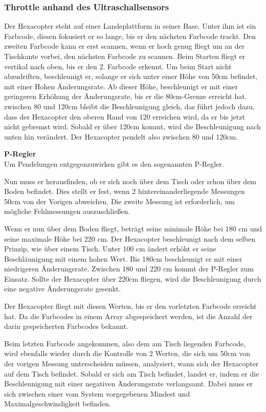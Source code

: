     \subsubsection{Throttle anhand des Ultraschallsensors}
    Der Hexacopter steht auf einer Landeplattform in seiner Base. Unter ihm ist ein Farbcode, diesen fokusiert er so lange, bis er den nächsten Farbcode trackt. Den zweiten Farbcode kann er erst scannen, wenn er hoch genug fliegt um an der Tischkante vorbei, den nächsten Farbcode zu scannen.
    Beim Starten fliegt er vertikal nach oben, bis er den 2. Farbcode erkennt. Um beim Start nicht abzudriften, beschleunigt er, solange er sich unter einer Höhe von 50cm befindet, mit einer Hohen Änderungsrate. Ab dieser Höhe, beschleunigt er mit einer geringeren Erhöhung der Änderungsrate, bis er die 80cm-Grenze erreicht hat.
    zwischen 80 und 120cm bleibt die Beschleunigung gleich, das führt jedoch dazu, dass der Hexacopter den oberen Rand von 120 erreichen wird, da er bis jetzt nicht gebremst wird. Sobald er über 120cm kommt, wird die Beschleunigung nach unten hin verändert. Der Hexacopter pendelt also zwischen 80 und 120cm.

    \textbf{P-Regler}\\
    Um Pendelungen entgegenzuwirken gibt es den sogenannten P-Regler.

    Nun muss er herausfinden, ob er sich noch über dem Tisch oder schon über dem Boden befindet. Dies stellt er fest, wenn 2 hintereinanderliegende Messungen 50cm von der Vorigen abweichen. Die zweite Messung ist erforderlich, um mögliche Fehlmessungen auszuschließen.

    Wenn er nun über dem Boden fliegt, beträgt seine minimale Höhe bei 180 cm und seine maximale Höhe bei 220 cm.
    Der Hexacopter beschleunigt nach dem selben Prinzip, wie über einem Tisch. Unter 100 cm ändert erhöht er seine Beschläunigung mit einem hohen Wert. Bis 180cm beschleunigt er mit einer niedrigeren Änderungsrate. Zwischen 180 und 220 cm kommt der P-Regler zum Einsatz. Sollte der Hexacopter über 220cm fliegen, wird die Beschleunigung durch eine negative Änderungsrate gesenkt.

    Der Hexacopter fliegt mit diesen Werten, bis er den vorletzten Farbcode erreicht hat. Da die Farbcodes in einem Array abgespeichert werden, ist die Anzahl der darin gespeicherten Farbcodes bekannt.

    Beim letzten Farbcode angekommen, also dem am Tisch liegenden Farbcode, wird ebenfalls wieder durch die Kontrolle von 2 Werten, die sich um 50cm von der vorigen Messung unterscheiden müssen, analysiert, wann sich der Hexacopter auf dem Tisch befindet. Sobald er sich am Tisch befindet, landet er, indem er die Beschleunigung mit einer negativen Änderungsrate verlangsamt. Dabei muss er sich zwischen einer vom System vorgegebenen Mindest und Maximalgeschwindigkeit befinden.

